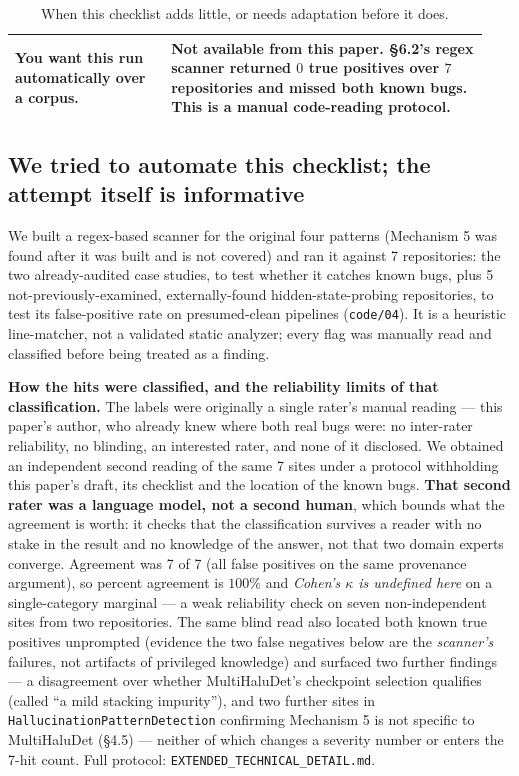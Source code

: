 \documentclass[10pt]{article} %
\begin{document}
\begin{table}[!ht]
\begin{tabular}{@{}p{0.31\linewidth}p{0.63\linewidth}@{}}
\addlinespace
You want this run automatically over a corpus. & Not available from this paper. §6.2's regex scanner returned $0$ true positives over $7$ repositories and missed both known bugs. This is a manual code-reading protocol. \\
\bottomrule
\end{tabular}
\caption{When this checklist adds little, or needs adaptation before it does.}
\label{tab:checklist-scope-neg}
\end{table}

\subsection{We tried to automate this checklist; the attempt itself is informative}

We built a regex-based scanner for the original four patterns (Mechanism 5 was
found after it was built and is not covered) and ran it against 7 repositories:
the two already-audited case studies, to test whether it catches known bugs,
plus 5 not-previously-examined, externally-found hidden-state-probing
repositories, to test its false-positive rate on presumed-clean pipelines
(\texttt{code/04}). It is a heuristic line-matcher, not a validated static
analyzer; every flag was manually read and classified before being treated as a
finding.

\textbf{How the hits were classified, and the reliability limits of that
classification.} The labels were originally a single rater's manual reading ---
this paper's author, who already knew where both real bugs were: no
inter-rater reliability, no blinding, an interested rater, and none of it
disclosed. We obtained an independent second reading of the same 7 sites under
a protocol withholding this paper's draft, its checklist and the location of
the known bugs. \textbf{That second rater was a language model, not a second
human}, which bounds what the agreement is worth: it checks that the
classification survives a reader with no stake in the result and no knowledge
of the answer, not that two domain experts converge. Agreement was 7 of 7 (all
false positives on the same provenance argument), so percent agreement is
$100\%$ and \emph{Cohen's $\kappa$ is undefined here} on a single-category
marginal --- a weak reliability check on seven non-independent sites from two
repositories. The same blind read also located both known true positives
unprompted (evidence the two false negatives below are the \emph{scanner's}
failures, not artifacts of privileged knowledge) and surfaced two further
findings --- a disagreement over whether MultiHaluDet's checkpoint selection
qualifies (called ``a mild stacking impurity''), and two further sites in
\texttt{HallucinationPatternDetection} confirming Mechanism 5 is not specific
to MultiHaluDet (§4.5) --- neither of which changes a severity number or
enters the 7-hit count. Full protocol: \texttt{EXTENDED\_TECHNICAL\_DETAIL.md}.
\end{document}

